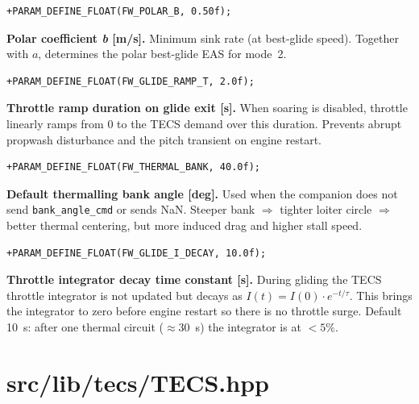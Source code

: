 \documentclass[12pt,a4paper]{article}
\begin{document}
\begin{lstlisting}[style=diff]
+PARAM_DEFINE_FLOAT(FW_POLAR_B, 0.50f);
\end{lstlisting}
\begin{annotation}\textbf{Polar coefficient \textit{b} [m/s].} Minimum sink rate (at best-glide speed). Together with $a$, determines the polar best-glide EAS for mode~2.\end{annotation}

\begin{lstlisting}[style=diff]
+PARAM_DEFINE_FLOAT(FW_GLIDE_RAMP_T, 2.0f);
\end{lstlisting}
\begin{annotation}\textbf{Throttle ramp duration on glide exit [s].} When soaring is disabled, throttle linearly ramps from 0 to the TECS demand over this duration. Prevents abrupt propwash disturbance and the pitch transient on engine restart.\end{annotation}

\begin{lstlisting}[style=diff]
+PARAM_DEFINE_FLOAT(FW_THERMAL_BANK, 40.0f);
\end{lstlisting}
\begin{annotation}\textbf{Default thermalling bank angle [deg].} Used when the companion does not send \texttt{bank\_angle\_cmd} or sends NaN. Steeper bank $\Rightarrow$ tighter loiter circle $\Rightarrow$ better thermal centering, but more induced drag and higher stall speed.\end{annotation}

\begin{lstlisting}[style=diff]
+PARAM_DEFINE_FLOAT(FW_GLIDE_I_DECAY, 10.0f);
\end{lstlisting}
\begin{annotation}\textbf{Throttle integrator decay time constant [s].} During gliding the TECS throttle integrator is not updated but decays as $I(t) = I(0) \cdot e^{-t/\tau}$. This brings the integrator to zero before engine restart so there is no throttle surge. Default 10~s: after one thermal circuit ($\approx 30$~s) the integrator is at $<5\%$.\end{annotation}

\section{src/lib/tecs/TECS.hpp}
\end{document}
